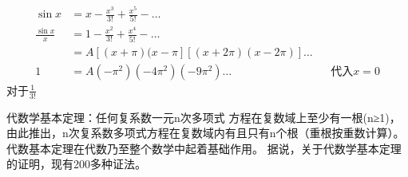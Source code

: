 \begin{thm}[How Euler compute $ \sum_{n=1}^{\infty} \frac{1}{n^2}   $]
\begin{align*}
		\sin x &= x- \frac{x^3}{3!} + \frac{x^5}{5!} -\ldots \\
		\frac{\sin x}{x} &= 1- \frac{x^2}{3!} + \frac{x^4}{5!} -\ldots \\
						 &= A[(x+\pi )(x-\pi ][(x+2\pi )(x-2\pi )]\ldots\\
		1&= A(-\pi ^2)(-4\pi ^2)(-9\pi ^2)\ldots   &&\text{代入} x=0
\end{align*}
对于$ \frac{1}{3!}  $
\end{thm}
\begin{thm}[代数基本定理]
		代数学基本定理：任何复系数一元n次多项式 方程在复数域上至少有一根(n≥1)，由此推出，n次复系数多项式方程在复数域内有且只有n个根（重根按重数计算）。代数基本定理在代数乃至整个数学中起着基础作用。 据说，关于代数学基本定理的证明，现有200多种证法。
\end{thm}

